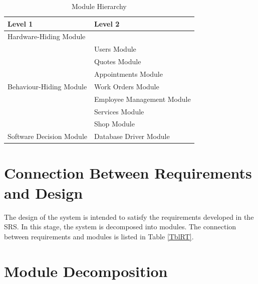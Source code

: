 \documentclass[12pt, titlepage]{article}
\begin{document}
\begin{table}[H]
	\centering
	\begin{tabular}{p{} p{}}
		\toprule
		\textbf{Level 1}                                      & \textbf{Level 2}           \\
		\midrule

		Hardware-Hiding Module                                & ~                          \\

		\midrule

		\multirow{7}{0.3\textwidth}{Behaviour-Hiding Module}  & Users Module               \\
		                                                      & Quotes Module              \\
		                                                      & Appointments Module        \\
		                                                      & Work Orders Module         \\
		                                                      & Employee Management Module \\
		                                                      & Services Module            \\
		                                                      & Shop Module                \\
		\midrule

		\multirow{1}{0.3\textwidth}{Software Decision Module} & Database Driver Module     \\

		\bottomrule
	\end{tabular}
	\caption{Module Hierarchy}
	\label{TblMH}
\end{table}

\section{Connection Between Requirements and Design} \label{SecConnection}

The design of the system is intended to satisfy the requirements developed in the SRS. In this
stage, the system is decomposed into modules. The connection between requirements and modules is
listed in Table \ref{TblRT}.

\section{Module Decomposition} \label{SecMD}
\end{document}
